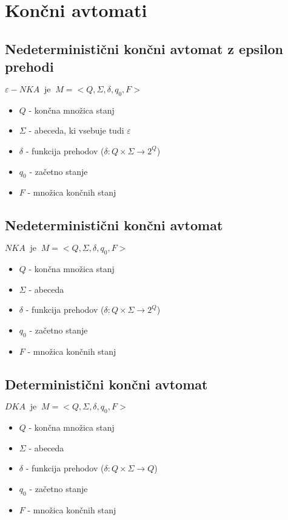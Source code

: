 \documentclass[10pt,a4paper]{article}
\begin{document}
\section{Končni avtomati}
	\subsection{Nedeterministični končni avtomat z epsilon prehodi }
		$ \varepsilon-NKA \ \mbox{ je } \  M = < Q , \Sigma , \delta ,q_0 , F > $
		\begin{itemize}
			\item $ Q $ - končna množica stanj
			\item $ \Sigma $ - abeceda, ki vsebuje tudi $\varepsilon$
			\item $ \delta $ - funkcija prehodov ($\delta : Q \times \Sigma \rightarrow 2^{Q}$)
			\item $ q_0 $ - začetno stanje
			\item $ F $ - množica končnih stanj
		\end{itemize}
	
	\subsection{Nedeterministični končni avtomat}
		$ NKA \ \mbox{ je } \  M = < Q , \Sigma , \delta ,q_0 , F > $
		\begin{itemize}
			\item $ Q $ - končna množica stanj
			\item $ \Sigma $ - abeceda
			\item $ \delta $ - funkcija prehodov ($\delta : Q \times \Sigma \rightarrow 2^{Q}$)
			\item $ q_0 $ - začetno stanje
			\item $ F $ - množica končnih stanj
		\end{itemize}		

	\subsection{Deterministični končni avtomat}
		$ DKA \ \mbox{ je } \  M = < Q , \Sigma , \delta ,q_0 , F > $
		\begin{itemize}
			\item $ Q $ - končna množica stanj
			\item $ \Sigma $ - abeceda
			\item $ \delta $ - funkcija prehodov ($\delta : Q \times \Sigma \rightarrow Q$)
			\item $ q_0 $ - začetno stanje
			\item $ F $ - množica končnih stanj
		\end{itemize}	
\end{document}
